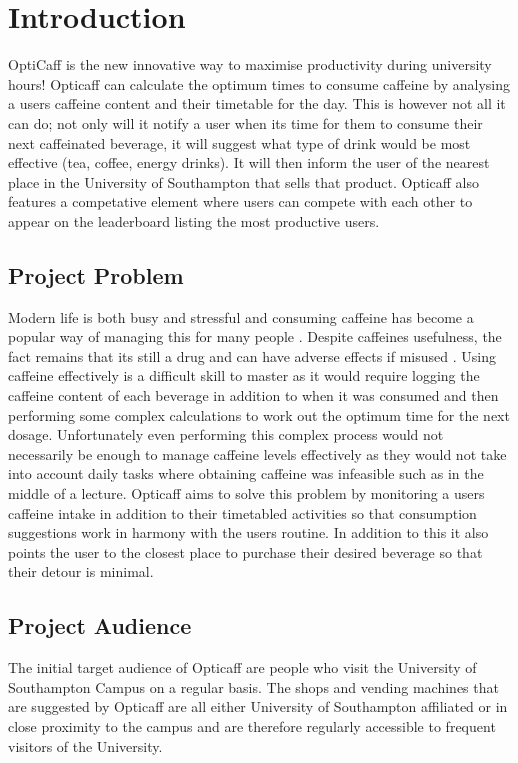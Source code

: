 \section{Introduction}

OptiCaff is the new innovative way to maximise productivity during university hours! 
Opticaff can calculate the optimum times to consume caffeine by analysing a users caffeine content and their timetable for the day. 
This is however not all it can do; not only will it notify a user when its time for them to consume their next caffeinated beverage, it will suggest what type of drink would be most effective (tea, coffee, energy drinks). 
It will then inform the user of the nearest place in the University of Southampton that sells that product.
Opticaff also features a competative element where users can compete with each other to appear on the leaderboard listing the most productive users.  

\subsection{Project Problem}
Modern life is both busy and stressful and consuming caffeine has become a popular way of managing this for many people \cite{Popularity}.
Despite caffeines usefulness, the fact remains that its still a drug and can have adverse effects if misused \cite{misuse}.
Using caffeine effectively is a difficult skill to master as it would require logging the caffeine content of each beverage in addition to when it was consumed and then performing some complex calculations to work out the optimum time for the next dosage.
Unfortunately even performing this complex process would not necessarily be enough to manage caffeine levels effectively as they would not take into account daily tasks where obtaining caffeine was infeasible such as in the middle of a lecture. 
Opticaff aims to solve this problem by monitoring a users caffeine intake in addition to their timetabled activities so that consumption suggestions work in harmony with the users routine.
In addition to this it also points the user to the closest place to purchase their desired beverage so that their detour is minimal.  
  
\subsection{Project Audience}
The initial target audience of Opticaff are people who visit the University of Southampton Campus on a regular basis. 
The shops and vending machines that are suggested by Opticaff are all either University of Southampton affiliated or in close proximity to the campus and are therefore regularly accessible to frequent visitors of the University.

